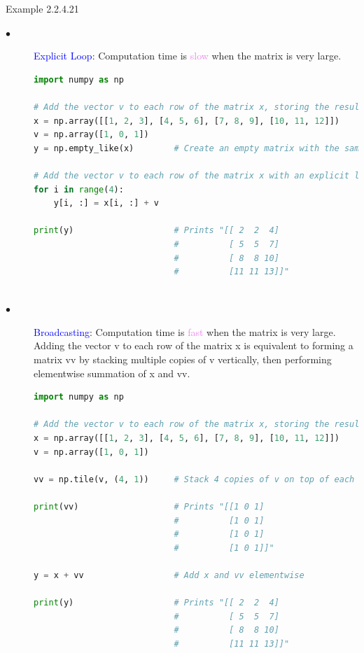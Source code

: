 \documentclass{book}
\begin{document}
\begin{egBox}{Example 2.2.4.21}{}
    \begin{description}
        \item[$\bullet$] \textcolor{blue}{Explicit Loop}: Computation time is \textcolor{violet}{slow} when the matrix is very large.
        \begin{lstlisting}[language=Python, basicstyle=\ttfamily\small, keywordstyle=\color{blue}, commentstyle=\color{forestgreen}, stringstyle=\color{red}, showstringspaces=false]
import numpy as np

# Add the vector v to each row of the matrix x, storing the result in the matrix y
x = np.array([[1, 2, 3], [4, 5, 6], [7, 8, 9], [10, 11, 12]])
v = np.array([1, 0, 1])
y = np.empty_like(x)        # Create an empty matrix with the same shape as x

# Add the vector v to each row of the matrix x with an explicit loop
for i in range(4):
    y[i, :] = x[i, :] + v

print(y)                    # Prints "[[ 2  2  4]
                            #          [ 5  5  7]
                            #          [ 8  8 10]
                            #          [11 11 13]]"
            
        \end{lstlisting}
        \item[$\bullet$] \textcolor{blue}{Broadcasting}: Computation time is \textcolor{violet}{fast} when the matrix is very large.\\
        Adding the vector v to each row of the matrix x is equivalent to forming a matrix vv by stacking multiple copies of v vertically, then performing elementwise summation of x and vv.
        \begin{lstlisting}[language=Python, basicstyle=\ttfamily\small, keywordstyle=\color{blue}, commentstyle=\color{forestgreen}, stringstyle=\color{red}, showstringspaces=false]
import numpy as np

# Add the vector v to each row of the matrix x, storing the result in the matrix y
x = np.array([[1, 2, 3], [4, 5, 6], [7, 8, 9], [10, 11, 12]])
v = np.array([1, 0, 1])

vv = np.tile(v, (4, 1))     # Stack 4 copies of v on top of each other

print(vv)                   # Prints "[[1 0 1]
                            #          [1 0 1]
                            #          [1 0 1]
                            #          [1 0 1]]"

y = x + vv                  # Add x and vv elementwise

print(y)                    # Prints "[[ 2  2  4]
                            #          [ 5  5  7]
                            #          [ 8  8 10]
                            #          [11 11 13]]"
        \end{lstlisting}
    \end{description}
\end{egBox}
\end{document}
